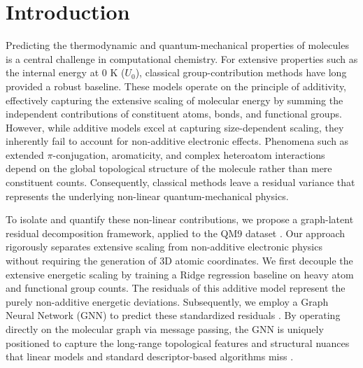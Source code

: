 \documentclass[]{article}
\begin{document}
\section{Introduction}
\label{sec:introduction}
Predicting the thermodynamic and quantum-mechanical properties of molecules is a central challenge in computational chemistry. For extensive properties such as the internal energy at 0 K ($U_0$), classical group-contribution methods have long provided a robust baseline. These models operate on the principle of additivity, effectively capturing the extensive scaling of molecular energy by summing the independent contributions of constituent atoms, bonds, and functional groups. However, while additive models excel at capturing size-dependent scaling, they inherently fail to account for non-additive electronic effects. Phenomena such as extended $\pi$-conjugation, aromaticity, and complex heteroatom interactions depend on the global topological structure of the molecule rather than mere constituent counts. Consequently, classical methods leave a residual variance that represents the underlying non-linear quantum-mechanical physics.

To isolate and quantify these non-linear contributions, we propose a graph-latent residual decomposition framework, applied to the QM9 dataset \citep{fu2025benchmarkquantumchemistryrelaxations}. Our approach rigorously separates extensive scaling from non-additive electronic physics without requiring the generation of 3D atomic coordinates. We first decouple the extensive energetic scaling by training a Ridge regression baseline on heavy atom and functional group counts. The residuals of this additive model represent the purely non-additive energetic deviations. Subsequently, we employ a Graph Neural Network (GNN) to predict these standardized residuals \citep{schütt2016quantumchemicalinsightsdeeptensor,xiang2025edbenchlargescaleelectrondensity}. By operating directly on the molecular graph via message passing, the GNN is uniquely positioned to capture the long-range topological features and structural nuances that linear models and standard descriptor-based algorithms miss \citep{schütt2016quantumchemicalinsightsdeeptensor,esders2024analyzingatomicinteractionsmolecules,xiang2025edbenchlargescaleelectrondensity}.
\end{document}
